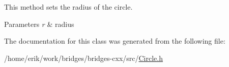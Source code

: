 This method sets the radius of the circle. 


\begin{DoxyParams}{Parameters}
{\em r} & radius \\
\hline
\end{DoxyParams}


The documentation for this class was generated from the following file\+:\begin{DoxyCompactItemize}
\item 
/home/erik/work/bridges/bridges-\/cxx/src/\hyperlink{_circle_8h}{Circle.\+h}\end{DoxyCompactItemize}

